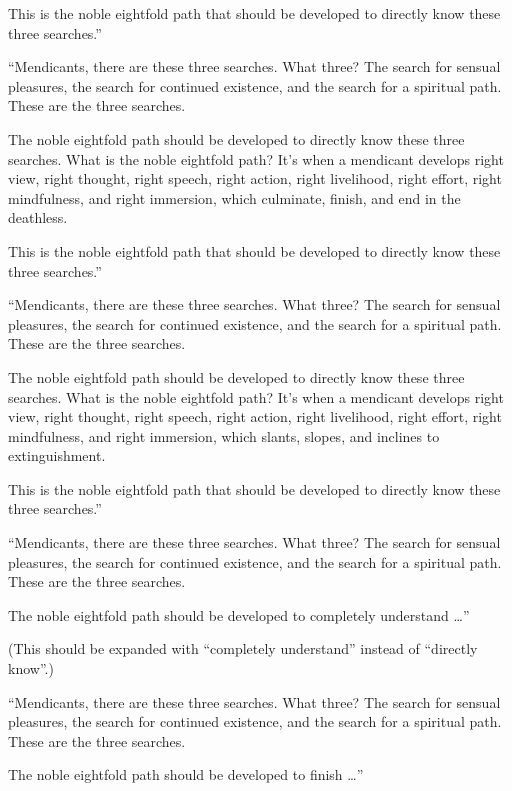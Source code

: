 \documentclass[12pt,openany]{book}%
\begin{document}
This is the noble eightfold path that should be developed to directly know these three searches.” 

“Mendicants, there are these three searches. What three? The search for sensual pleasures, the search for continued existence, and the search for a spiritual path. These are the three searches. 

The noble eightfold path should be developed to directly know these three searches. What is the noble eightfold path? It’s when a mendicant develops right view, right thought, right speech, right action, right livelihood, right effort, right mindfulness, and right immersion, which culminate, finish, and end in the deathless. 

This is the noble eightfold path that should be developed to directly know these three searches.” 

“Mendicants, there are these three searches. What three? The search for sensual pleasures, the search for continued existence, and the search for a spiritual path. These are the three searches. 

The noble eightfold path should be developed to directly know these three searches. What is the noble eightfold path? It’s when a mendicant develops right view, right thought, right speech, right action, right livelihood, right effort, right mindfulness, and right immersion, which slants, slopes, and inclines to extinguishment. 

This is the noble eightfold path that should be developed to directly know these three searches.” 

“Mendicants, there are these three searches. What three? The search for sensual pleasures, the search for continued existence, and the search for a spiritual path. These are the three searches. 

The noble eightfold path should be developed to completely understand …” 

(This should be expanded with “completely understand” instead of “directly know”.) 

“Mendicants, there are these three searches. What three? The search for sensual pleasures, the search for continued existence, and the search for a spiritual path. These are the three searches. 

The noble eightfold path should be developed to finish …” 
\end{document}
